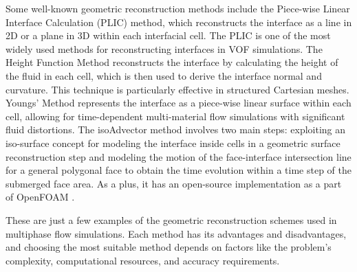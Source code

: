 Some well-known geometric reconstruction methods include the Piece-wise Linear Interface Calculation (PLIC) \cite{huang2012piecewise} method, which reconstructs the interface as a line in 2D or a plane in 3D within each interfacial cell. The PLIC is one of the most widely used methods for reconstructing interfaces in VOF simulations. The Height Function Method \cite{height-function} reconstructs the interface by calculating the height of the fluid in each cell, which is then used to derive the interface normal and curvature. This technique is particularly effective in structured Cartesian meshes. Youngs' Method \cite{youngs-method} represents the interface as a piece-wise linear surface within each cell, allowing for time-dependent multi-material flow simulations with significant fluid distortions. The isoAdvector \cite{roenby2019isoadvector} method involves two main steps: exploiting an iso-surface concept for modeling the interface inside cells in a geometric surface reconstruction step and modeling the motion of the face-interface intersection line for a general polygonal face to obtain the time evolution within a time step of the submerged face area. As a plus, it has an open-source implementation as a part of OpenFOAM \cite{jasak2007openfoam}.

These are just a few examples of the geometric reconstruction schemes used in multiphase flow simulations. Each method has its advantages and disadvantages, and choosing the most suitable method depends on factors like the problem's complexity, computational resources, and accuracy requirements.

